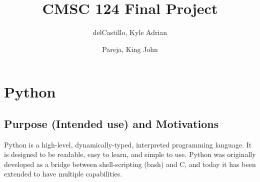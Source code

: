 \documentclass{article}
\title{%
  CMSC 124 Final Project\\
  \large 
}
\author{
  delCastillo, Kyle Adrian
  \and
  Pareja, King John
}
\begin{document}
\maketitle

\section*{Python}

\subsection*{Purpose (Intended use) and Motivations}
Python is a high-level, dynamically-typed, interpreted programming language. It is designed to be readable, easy to learn, and simple to use. Python was originally developed as a bridge between shell-scripting (bash) and C, and today it has been extended to have multiple capabilities.
\end{document}
